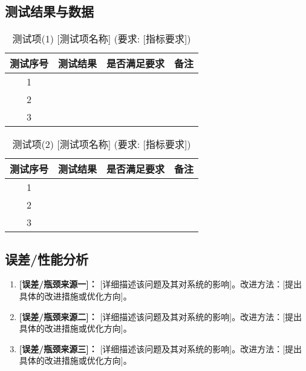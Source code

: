 \documentclass[UTF-8,zihao=-4]{ctexart}
\begin{document}
\subsection{测试结果与数据}
    \begin{table}[H]
        \centering
        \caption{测试项(1) [测试项名称] (要求: [指标要求])}
        \label{tab:task1}
        \begin{tabular}{cccc}
            \toprule
            测试序号 & 测试结果 & 是否满足要求 & 备注 \\
            \midrule
            1 & & & \\
            2 & & & \\
            3 & & & \\
            \bottomrule
        \end{tabular}
    \end{table}

    \begin{table}[H]
        \centering
        \caption{测试项(2) [测试项名称] (要求: [指标要求])}
        \label{tab:task2}
        \begin{tabular}{cccc}
            \toprule
            测试序号 & 测试结果 & 是否满足要求 & 备注 \\
            \midrule
            1 & & & \\
            2 & & & \\
            3 & & & \\
            \bottomrule
        \end{tabular}
    \end{table}
    

\subsection{误差/性能分析}
    \begin{enumerate}
        \item \textbf{[误差/瓶颈来源一]：} [详细描述该问题及其对系统的影响]。改进方法：[提出具体的改进措施或优化方向]。
        \item \textbf{[误差/瓶颈来源二]：} [详细描述该问题及其对系统的影响]。改进方法：[提出具体的改进措施或优化方向]。
        \item \textbf{[误差/瓶颈来源三]：} [详细描述该问题及其对系统的影响]。改进方法：[提出具体的改进措施或优化方向]。
    \end{enumerate}
\end{document}
